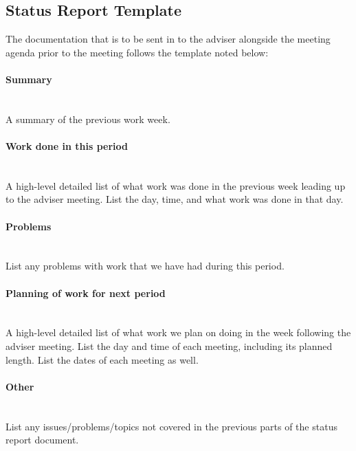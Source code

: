 \documentclass[../document]{subfiles}
\begin{document}
\subsection{Status Report Template}
The documentation that is to be sent in to the adviser alongside the meeting agenda prior to the meeting follows the template noted below:

\paragraph{Summary} \ \\
A summary of the previous work week.

\paragraph{Work done in this period} \ \\
A high-level detailed list of what work was done in the previous week leading up to the adviser meeting. List the day, time, and what work was done in that day.

\paragraph{Problems} \ \\
List any problems with work that we have had during this period.

\paragraph{Planning of work for next period} \ \\
A high-level detailed list of what work we plan on doing in the week following the adviser meeting. List the day and time of each meeting, including its planned length. List the dates of each meeting as well.

\paragraph{Other} \ \\
List any issues/problems/topics not covered in the previous parts of the status report document.
\end{document}
